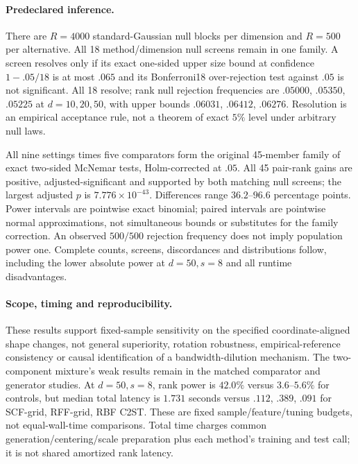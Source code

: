 \paragraph{Predeclared inference.}
There are $R=4000$ standard-Gaussian null blocks per dimension and $R=500$
per alternative. All 18 method/dimension null screens remain in one family.
A screen resolves only if its exact one-sided upper size bound at confidence
$1-.05/18$ is at most $.065$ and its Bonferroni18 over-rejection test against
$.05$ is not significant. All 18 resolve; rank null rejection frequencies are
$.05000$, $.05350$, $.05225$ at $d=10,20,50$, with upper bounds
$.06031$, $.06412$, $.06276$. Resolution is an empirical acceptance rule,
not a theorem of exact $5\%$ level under arbitrary null laws.

All nine settings times five comparators form the original 45-member family
of exact two-sided McNemar tests, Holm-corrected at $.05$. All 45 pair-rank
gains are positive, adjusted-significant and supported by both matching null
screens; the largest adjusted $p$ is $7.776\times10^{-43}$. Differences range
$36.2$--$96.6$ percentage points. Power intervals are pointwise exact binomial;
paired intervals are pointwise normal approximations, not simultaneous bounds
or substitutes for the family correction. An observed $500/500$ rejection
frequency does not imply population power one. Complete counts, screens,
discordances and distributions follow, including the lower absolute power at
$d=50,s=8$ and all runtime disadvantages.

\paragraph{Scope, timing and reproducibility.}
These results support fixed-sample sensitivity on the specified
coordinate-aligned shape changes, not general superiority, rotation robustness,
empirical-reference consistency or causal identification of a bandwidth-dilution
mechanism. The two-component mixture's weak results remain in the matched
comparator and generator studies. At $d=50,s=8$, rank power is $42.0\%$
versus $3.6$--$5.6\%$ for controls, but median total latency is $1.731$
seconds versus $.112$, $.389$, $.091$ for SCF-grid, RFF-grid, RBF C2ST.
These are fixed sample/feature/tuning budgets, not equal-wall-time comparisons.
Total time charges common generation/centering/scale preparation plus each
method's training and test call; it is not shared amortized rank latency.

